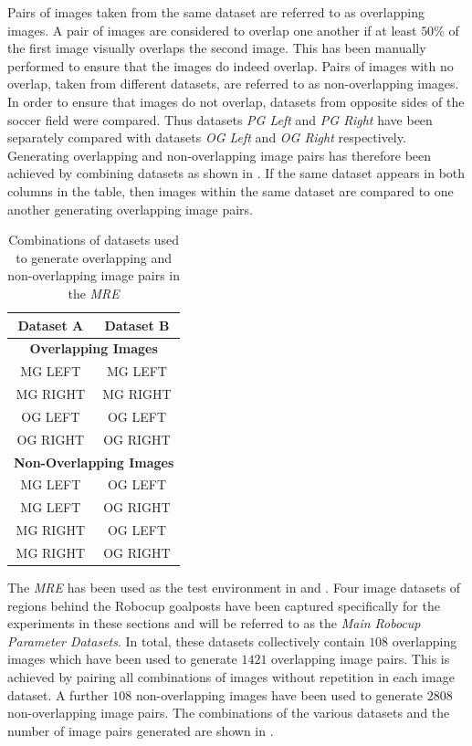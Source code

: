 \documentclass{report}
\begin{document}
Pairs of images taken from the same dataset are referred to as overlapping images. A pair of images are considered to overlap one another if at least $50\%$ of the first image visually overlaps the second image. This has been manually performed to ensure that the images do indeed overlap. Pairs of images with no overlap, taken from different datasets, are referred to as non-overlapping images. In order to ensure that images do not overlap, datasets from opposite sides of the soccer field were compared. Thus datasets \textit{PG Left} and \textit{PG Right} have been separately compared with datasets \textit{OG Left} and \textit{OG Right} respectively. Generating overlapping and non-overlapping image pairs has therefore been achieved by combining datasets as shown in . If the same dataset appears in both columns in the table, then images within the same dataset are compared to one another generating overlapping image pairs. \\

\begin{table}
\caption{Combinations of datasets used to generate overlapping and non-overlapping image pairs in the \textit{MRE}}
\begin{tabular}{|c|c|}
\hline 
\textbf{Dataset A} & \textbf{Dataset B}\tabularnewline
\hline 
\hline 
\multicolumn{2}{|c|}{\textbf{Overlapping Images}}\tabularnewline
\hline 
MG LEFT & MG LEFT\tabularnewline
\hline 
MG RIGHT & MG RIGHT\tabularnewline
\hline 
OG LEFT & OG LEFT\tabularnewline
\hline 
OG RIGHT & OG RIGHT\tabularnewline
\hline 
\multicolumn{2}{|c|}{\textbf{Non-Overlapping Images}}\tabularnewline
\hline 
MG LEFT & OG LEFT\tabularnewline
\hline 
MG LEFT & OG RIGHT\tabularnewline
\hline 
MG RIGHT & OG LEFT\tabularnewline
\hline 
MG RIGHT & OG RIGHT\tabularnewline
\hline 
\end{tabular}
\label{table:overlap}
\end{table}

The \textit{MRE} has been used as the test environment in  and . Four image datasets of regions behind the Robocup goalposts have been captured specifically for the experiments in these sections and will be referred to as the \textit{Main Robocup Parameter Datasets}. In total, these datasets collectively contain $108$ overlapping images which have been used to generate $1421$ overlapping image pairs. This is achieved by pairing all combinations of images without repetition in each image dataset. A further $108$ non-overlapping images have been used to generate $2808$ non-overlapping image pairs. The combinations of the various datasets and the number of image pairs generated are shown in . \\
\end{document}
